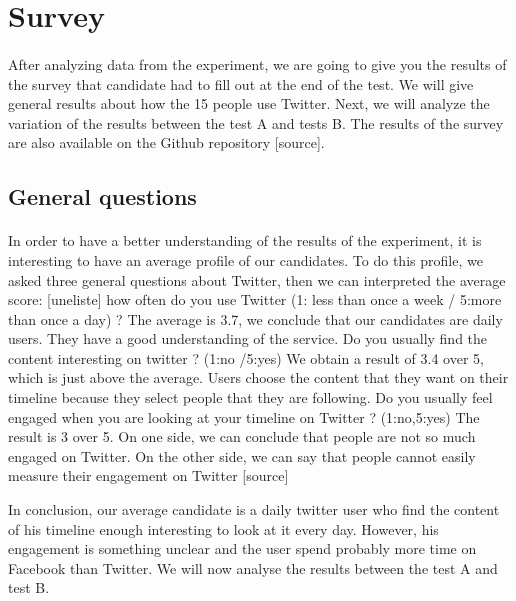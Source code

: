 \section{Survey}

\paragraph{}
After analyzing data from the experiment, we are going to give you the results of the survey that candidate had to fill out at the end of the test. We will give general results about how the 15 people use Twitter. Next, we will analyze the variation of the results between the test A and tests B. The results of the survey are also available on the Github repository [source].

\subsection{General questions}

\paragraph{}
In order to have a better understanding of the results of the experiment, it is interesting to have an average profile of our candidates. To do this profile, we asked three general questions about Twitter, then we can interpreted the average score:
[uneliste]
how often do you use Twitter (1: less than once a week / 5:more than once a day) ?
The average is 3.7, we conclude that our candidates are daily users. They have a good understanding of the service.
Do you usually find the content interesting on twitter ? (1:no /5:yes)
We obtain a result of 3.4 over 5, which is just above the average. Users choose the content that they want on their timeline because they select people that they are following.
Do you usually feel engaged when you are looking at your timeline on Twitter ? (1:no,5:yes)
The result is 3 over 5. On one side, we can conclude that people are not so much engaged on Twitter. On the other side, we can say that people cannot easily measure their engagement on Twitter [source]

In conclusion, our average candidate is a daily twitter user who find the content of his timeline enough interesting to look at it every day. However, his engagement is something unclear and the user spend probably more time on Facebook than Twitter. We will now analyse the results between the test A and test B.


